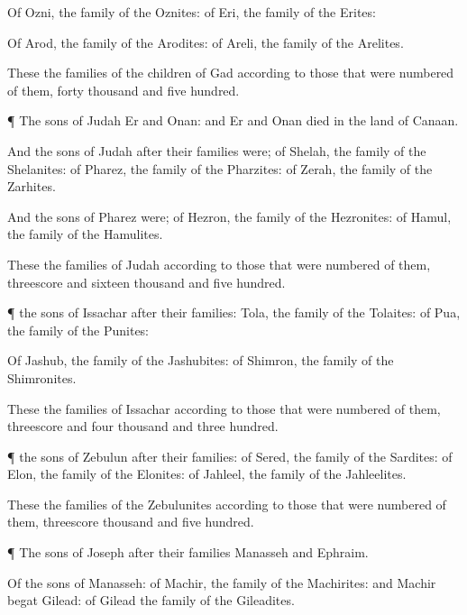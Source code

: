{Of
Ozni, the
family of the
Oznites: of
Eri, the
family of the
Erites:

Of
Arod, the
family of the
Arodites: of
Areli, the
family of the
Arelites.

These
{} the
families of the
children of
Gad according to those that were
numbered of them,
forty
thousand and
five
hundred.


\par }{\PP {}¶ The
sons of
Judah
{}
Er and
Onan: and
Er and
Onan
died in the
land of
Canaan.

And the
sons of
Judah after their
families were; of
Shelah, the
family of the
Shelanites: of
Pharez, the
family of the
Pharzites: of
Zerah, the
family of the
Zarhites.

And the
sons of
Pharez were; of
Hezron, the
family of the
Hezronites: of
Hamul, the
family of the
Hamulites.

These
{} the
families of
Judah according to those that were
numbered of them, threescore and
sixteen
thousand and
five
hundred.


\par }{\PP {}¶
{} the
sons of
Issachar after their
families:
{}
Tola, the
family of the
Tolaites: of
Pua, the
family of the
Punites:

Of
Jashub, the
family of the
Jashubites: of
Shimron, the
family of the
Shimronites.

These
{} the
families of
Issachar according to those that were
numbered of them,
threescore and
four
thousand and
three
hundred.


\par }{\PP {}¶
{} the
sons of
Zebulun after their
families: of
Sered, the
family of the
Sardites: of
Elon, the
family of the
Elonites: of
Jahleel, the
family of the
Jahleelites.

These
{} the
families of the
Zebulunites according to those that were
numbered of them,
threescore
thousand and
five
hundred.


\par }{\PP {}¶ The
sons of
Joseph after their
families
{}
Manasseh and
Ephraim.

Of the
sons of
Manasseh: of
Machir, the
family of the
Machirites: and
Machir
begat
Gilead: of
Gilead
{} the
family of the
Gileadites.

}
